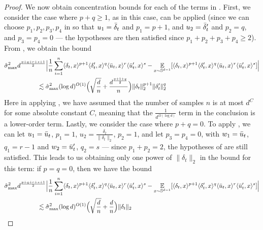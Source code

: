 \begin{proof}
We now obtain concentration bounds for each of the terms in . First, we consider the case where $p + q \geq 1$, as in this case,  can be applied (since we can choose $p_1, p_2, p_3, p_4$ in  so that $u_1 = \bar{\delta}_t$ and $p_1 = p + 1$, and $u_2 = \bar{\delta}_t'$ and $p_2 = q$, and $p_3 = p_4 = 0$ --- the hypotheses are then satisfied since $p_1 + p_2 + p_3 + p_4 \geq 2$). From , we obtain the bound
\begin{align}
& \hat{\sigma}_{\textup{max}}^2 d^{\frac{p + q + r + s + 1}{2}} \Big|\frac{1}{n} \sum_{i = 1}^n \langle \delta_t, x \rangle^{p + 1} \langle \delta_t', x \rangle^q \langle \bar{u}_t, x \rangle^r \langle \bar{u}_t', x \rangle^s - \operatorname*{\mathbb{E}}_{x \sim \mathbb{S}^{d - 1}} [\langle \delta_t, x \rangle^{p + 1} \langle \delta_t', x \rangle^q \langle \bar{u}_t, x \rangle^r \langle \bar{u}_t', x \rangle^s] \Big| \\
& \,\,\,\,\,\,\,\,\,\,\,\,\,\,\,\,\,\,\,\,\,\,\,\,\,\,\,\,\,\,\,\, \lesssim \hat{\sigma}_{\textup{max}}^2 (\log d)^{O(1)} \Big(\sqrt{\frac{d}{n}} + \frac{d^{\frac{p + 1 + q}{2}}}{n} \Big) \|\delta_t\|_2^{p + 1} \|\delta_t'\|_2^q
\end{align}
Here in applying , we have assumed that the number of samples $n$ is at most $d^C$ for some absolute constant $C$, meaning that the $\frac{1}{d^{\Omega(\log d)}}$ term in the conclusion is a lower-order term. Lastly, we consider the case where $p + q = 0$. To apply , we can let $u_1 = \bar{u}_t$, $p_1 = 1$, $u_2 = \frac{\delta_t}{\|\delta_t\|_2}$, $p_2 = 1$, and let $p_3 = p_4 = 0$, with $w_1 = \bar{u}_t$, $q_1 = r - 1$ and $w_2 = \bar{u}_t'$, $q_2 = s$ --- since $p_1 + p_2 = 2$, the hypotheses of  are still satisfied. This leads to us obtaining only one power of $\|\delta_t\|_2$ in the bound for this term: if $p = q = 0$, then we have the bound
\begin{align}
& \hat{\sigma}_{\textup{max}}^2 d^{\frac{p + q + r + s + 1}{2}} \Big|\frac{1}{n} \sum_{i = 1}^n \langle \delta_t, x \rangle^{p + 1} \langle \delta_t', x \rangle^q \langle \bar{u}_t, x \rangle^r \langle \bar{u}_t', x \rangle^s - \operatorname*{\mathbb{E}}_{x \sim \mathbb{S}^{d - 1}} [\langle \delta_t, x \rangle^{p + 1} \langle \delta_t', x \rangle^q \langle \bar{u}_t, x \rangle^r \langle \bar{u}_t', x \rangle^s] \Big| \\
& \,\,\,\,\,\,\,\,\,\,\,\,\,\,\,\,\,\,\,\,\,\,\,\,\,\,\,\,\,\,\,\, \lesssim \hat{\sigma}_{\textup{max}}^2 (\log d)^{O(1)}\Big(\sqrt{\frac{d}{n}} + \frac{d}{n}\Big) \|\delta_t\|_2
\end{align}

\end{proof}
